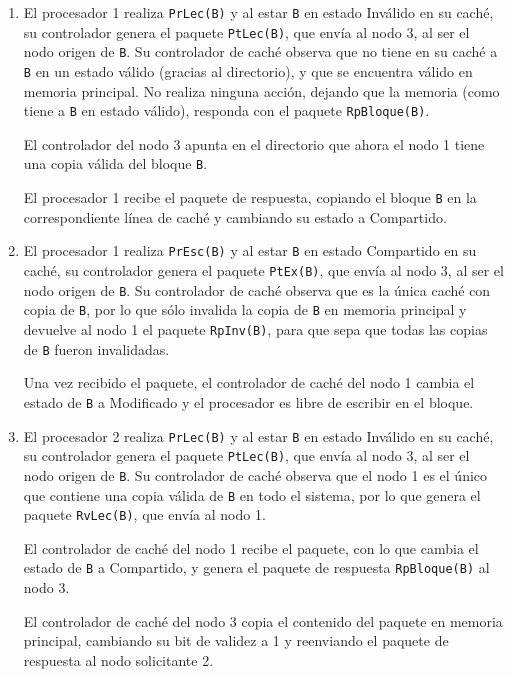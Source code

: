 \begin{ejercicio}
\begin{enumerate}
    \begin{enumerate}
        \item El procesador 1 realiza \verb|PrLec(B)| y al estar \verb|B| en estado Inválido en su caché, su controlador genera el paquete \verb|PtLec(B)|, que envía al nodo 3, al ser el nodo origen de \verb|B|. Su controlador de caché observa que no tiene en su caché a \verb|B| en un estado válido (gracias al directorio), y que se encuentra válido en memoria principal. No realiza ninguna acción, dejando que la memoria (como tiene a \verb|B| en estado válido), responda con el paquete \verb|RpBloque(B)|. 

        El controlador del nodo 3 apunta en el directorio que ahora el nodo 1 tiene una copia válida del bloque \verb|B|.

        El procesador 1 recibe el paquete de respuesta, copiando el bloque \verb|B| en la correspondiente línea de caché y cambiando su estado a Compartido.

        \item El procesador 1 realiza \verb|PrEsc(B)| y al estar \verb|B| en estado Compartido en su caché, su controlador genera el paquete \verb|PtEx(B)|, que envía al nodo 3, al ser el nodo origen de \verb|B|. Su controlador de caché observa que es la única caché con copia de \verb|B|, por lo que sólo invalida la copia de \verb|B| en memoria principal y devuelve al nodo 1 el paquete \verb|RpInv(B)|, para que sepa que todas las copias de \verb|B| fueron invalidadas.

            Una vez recibido el paquete, el controlador de caché del nodo 1 cambia el estado de \verb|B| a Modificado y el procesador es libre de escribir en el bloque.

        \item El procesador 2 realiza \verb|PrLec(B)| y al estar \verb|B| en estado Inválido en su caché, su controlador genera el paquete \verb|PtLec(B)|, que envía al nodo 3, al ser el nodo origen de \verb|B|. Su controlador de caché observa que el nodo 1 es el único que contiene una copia válida de \verb|B| en todo el sistema, por lo que genera el paquete \verb|RvLec(B)|, que envía al nodo 1.

            El controlador de caché del nodo 1 recibe el paquete, con lo que cambia el estado de \verb|B| a Compartido, y genera el paquete de respuesta \verb|RpBloque(B)| al nodo 3.

            El controlador de caché del nodo 3 copia el contenido del paquete en memoria principal, cambiando su bit de validez a 1 y reenviando el paquete de respuesta al nodo solicitante 2.


\end{enumerate}
\end{enumerate}
\end{ejercicio}
